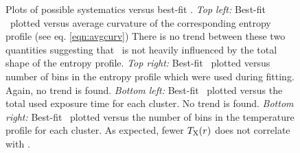 \begin{center}
\begin{figure}[htp]
\begin{minipage}[htp]{0.5\linewidth}
    \end{minipage}
    \caption{Plots of possible systematics versus best-fit \kna.
      {\it{Top left:}} Best-fit \kna\ plotted versus average curvature
      of the corresponding entropy profile (see eq. \ref{eqn:avgcurv})
      There is no trend between these two quantities suggesting that
      \kna\ is not heavily influenced by the total shape of the
      entropy profile. {\it{Top right:}} Best-fit \kna\ plotted versus
      number of bins in the entropy profile which were used during
      fitting. Again, no trend is found. {\it{Bottom left:}} Best-fit
      \kna\ plotted versus the total used exposure time for each
      cluster. No trend is found. {\it{Bottom right:}} Best-fit
      \kna\ plotted versus the number of bins in the temperature
      profile for each cluster. As expected, fewer $T_{\mathrm{X}}(r)$ does not
      correlate with \kna.}
    \label{fig:sys}
  \end{figure}
\end{center}
\clearpage
